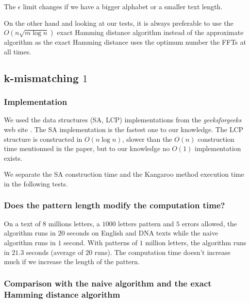 \documentclass[preprint,12pt]{elsarticle}
\begin{document}
The $\epsilon$ limit changes if we have a bigger alphabet or a smaller text length.

On the other hand and looking at our tests,
it is always preferable to use the $O(n \sqrt{m \log n})$ exact Hamming distance algorithm
instead of the approximate algorithm as the exact Hamming distance uses the optimum number the FFTs at all times.







\subsection{k-mismatching $1$}

\subsubsection*{Implementation}

We used the data structures (SA, LCP) implementations from the \textit{geeksforgeeks} web site \cite{geek}.
The SA implementation is the fastest one to our knowledge. %
The LCP structure is constructed in $O(n \log n)$,
slower than the $O(n)$ construction time mentionned in the paper,
but to our knowledge no $O(1)$ implementation exists.

We separate the SA construction time and the Kangaroo method execution time in the following tests.

\subsubsection*{Does the pattern length modify the computation time?}

On  a text of $8$ millions letters, a $1 000$ letters pattern and $5$ errors allowed,
the algorithm runs in $20$ seconds on English and DNA texts while the naive algorithm runs in $1$ second.
With patterns of $1$ million letters, the algorithm runs in $21.3$ seconds (average of $20$ runs).
The computation time doesn't increase much if we increase the length of the pattern.



\subsubsection*{Comparison with the naive algorithm and the exact Hamming distance algorithm}
\end{document}
